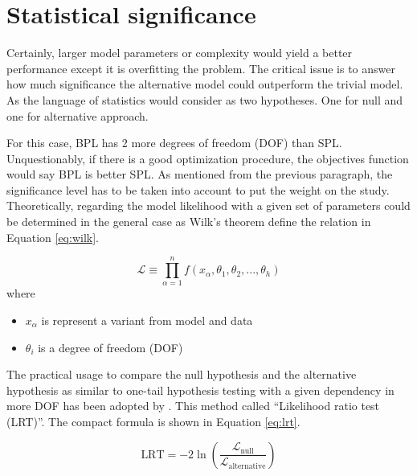 \section{Statistical significance}

Certainly, larger model parameters or complexity would yield 
a better performance except it is overfitting the problem.
The critical issue is to answer how much significance the alternative 
model could outperform the trivial model. As the language of statistics 
would consider as two hypotheses. One for null and one for alternative 
approach. 

For this case, BPL has 2 more degrees of freedom (DOF) than SPL.
Unquestionably, if there is a good optimization procedure, 
the objectives function would say BPL is better SPL. As mentioned 
from the previous paragraph, the significance level has to be taken
into account to put the weight on the study. Theoretically, regarding 
the model likelihood with a given set of parameters could be determined 
in the general case as Wilk's theorem define the relation in 
Equation \ref{eq:wilk}.

\begin{equation}
    \mathcal{L} \equiv \prod_{\alpha=1}^n f(x_\alpha, \theta_1, \theta_2, ..., \theta_h)
    \label{eq:wilk}
\end{equation}
where 
\begin{itemize}
    \item $x_\alpha$ is represent a variant from model and data
    \item $\theta_i$ is a degree of freedom (DOF)
\end{itemize}

The practical usage to compare the null hypothesis and the alternative 
hypothesis as similar to one-tail hypothesis testing with a given 
dependency in more DOF has been adopted by \cite{Huelsenbeck}.
This method called ``Likelihood ratio test (LRT)''. The compact formula 
is shown in Equation \ref{eq:lrt}.

\begin{equation}
    \text{LRT} = -2\ln\left(\frac{\mathcal{L}_\text{null}}{\mathcal{L}_\text{alternative}}\right)
    \label{eq:lrt}
\end{equation}








